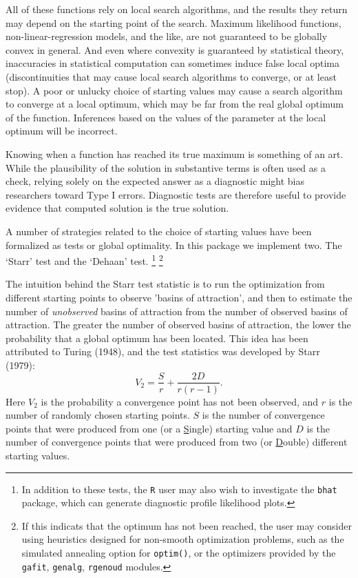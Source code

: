 \documentclass[11pt]{article}
\begin{document}
All of these functions rely on local search algorithms, and the results they
return may depend on the starting point of the search. Maximum likelihood functions, non-linear-regression models, and the like, are not guaranteed to 
be globally convex in general. And even where convexity is guaranteed by statistical theory, inaccuracies in statistical computation can sometimes induce false local optima (discontinuities that may cause local search algorithms to converge, or at least stop).  A poor or unlucky choice of starting values may cause a search algorithm to converge at a local optimum, which may be far from the real global optimum of the function.  Inferences based on the values of the parameter at the local optimum will be incorrect. 

Knowing when a function has reached its true maximum is
something of an art. While the plausibility of the solution
in substantive terms is often used as a check, relying solely on the expected
answer as a diagnostic might bias researchers toward Type I errors. Diagnostic
tests are therefore useful to provide evidence that computed
solution is the true solution.

A number of strategies related to the choice of   starting values
 have been formalized as tests or global optimality. In this package we 
 implement two. The `Starr' test and the `Dehaan' test.
\footnote{In addition to these tests, the \texttt{R} user may also wish to investigate
the \texttt{bhat} package, which can generate diagnostic profile likelihood plots.} 
\footnote{If this indicats that the optimum has not been reached, the user may consider
using  heuristics designed for non-smooth optimization problems, such as the simulated annealing option for \texttt{optim()}, or the optimizers provided by  the \texttt{gafit}, \texttt{genalg}, 
\texttt{rgenoud} modules.}
 
The intuition behind the Starr test statistic is to run the optimization from 
different starting points to observe 'basins of attraction', and then to
estimate the number of \emph{unobserved} basins of attraction from the
number of observed basins of attraction.  The greater the number
of observed basins of attraction, the lower the probability that a
global optimum has been located.  This idea has been attributed to Turing (1948),
and the test statistics was developed  by Starr (1979):
\begin{equation}\label{Starr.test.equation}
    V_{2}=\frac{S}{r}+\frac{2D}{r\left( r-1\right)}.
\end{equation} Here $V_2$ is the probability a convergence
point has not been observed, and $r$ is the number of randomly
chosen starting points. $S$ is the number of convergence points
that were produced from one (or a {\underline{S}}ingle) starting
value and $D$ is the number of convergence points that were
produced from two (or {\underline{D}}ouble) different starting
values. 
\end{document}
